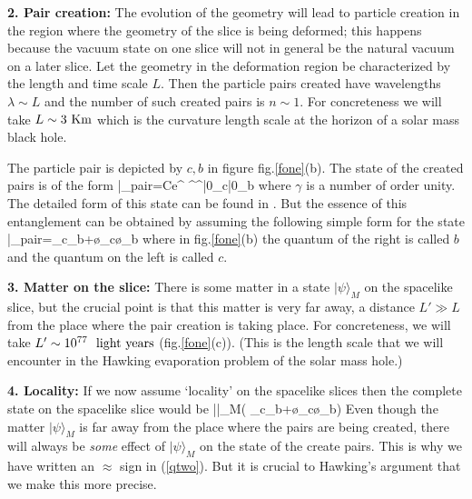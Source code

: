 \documentclass[12pt]{article}
\begin{document}
\b

{\bf 2. Pair creation:} The evolution of the geometry will lead to particle creation in the region where the geometry of the slice is being deformed; this happens because  the vacuum state on one slice will not in general be the natural vacuum on a later slice.  Let the geometry in the deformation region 
 be characterized by the length and time scale $L$. Then the particle pairs created have wavelengths $\lambda\sim L$
and the number of such created pairs is $n\sim 1$. For concreteness we will take 
$L\sim 3 ~{\rm Km}$
which is the curvature length scale at the horizon of a solar mass black hole.

The particle pair is depicted by $c, b$ in figure fig.\ref{fone}(b).
The state of the created pairs is of the form
 \be
 |\Psi\rangle_{\rm pair}=Ce^{ ^^\dagger}|0\rangle_c|0\rangle_b
 \label{actualstate}
 \ee
 where $\gamma$ is a number of order unity. The detailed form of this state can be found in \cite{hawking,giddings}. But the essence of this entanglement can be obtained by assuming the following simple form for the state
\be
|\Psi\rangle_{\rm pair}=\sq \z_c\z_b+\sq\o_c\o_b
\label{pairs}
\ee
where in fig.\ref{fone}(b)  the quantum of the right is called $b$ and the quantum on the left is called $c$. 


\b

{\bf 3. Matter on the slice:} There is some matter in a state $|\psi\rangle_M$ on the spacelike slice, but the crucial point is that this matter is very far away, a distance
$L'\gg L$
from the place where the pair creation is taking place. For concreteness, we will take
$L'\sim 10^{77} ~~{\rm light~years}$ (fig.\ref{fone}(c)).
(This is the length scale that we will encounter in the Hawking evaporation problem of the solar mass hole.)


\b

{\bf 4. Locality:} If we now assume  `locality' on the spacelike slices then the complete state on the spacelike slice would be
\be
|\Psi\rangle\approx |\psi\rangle_M\otimes\Big( \sq \z_c\z_b+\sq\o_c\o_b\Big)
\label{qtwo}
\ee
Even though the matter $|\psi\rangle_M$ is far away from the place where the pairs are being created, there will always be {\it some} effect of $|\psi\rangle_M$ on the state of the create pairs. This is why we have written an $\approx$ sign in (\ref{qtwo}). But it is crucial to Hawking's argument that we make this more precise.
\end{document}
